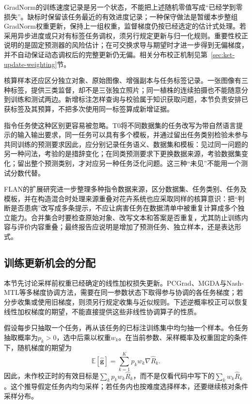 GradNorm的训练速度记录是另一个状态，不能把上述随机零值写成“已经学到零损失”。缺标时保留该任务最近的有效进度记录；一种保守做法是暂缓本步整组GradNorm权重更新，保持上一组权重，监督梯度仍按已经选定的估计式处理。若采用异步进度或只对有标签任务调权，须另行规定更新与归一化规则。重要性校正说明的是固定预测器的风险估计；在可交换求导与期望时才进一步得到无偏梯度，并不自动保证动态调权后的完整更新仍无偏。相关分布校正机制见第~\ref{sec:ket-update-weighting}节。

核算样本还应区分独立对象、原始图像、增强副本与任务标签记录。一张图像有三种标签，提供三类监督，却不是三张独立照片；同一植株的连续拍摄也不能随意分到训练和测试两边。新增标注怎样查询与校验属于知识获取问题，本节负责安排已获标签及其预算，不把多次使用同一标签算成新增证据。

指令任务使这种区别更容易被忽略。T0将不同数据集的任务改写为带自然语言提示的输入输出要求，同一任务可以具有多个模板，并通过留出任务类别检验未参与共同训练的预测要求因此，应分别记录任务语义、数据集和模板：见过同一问题的另一种问法，考验的是措辞变化；在同类预测要求下更换数据来源，考验数据集变化；留出整个预测类别，才对应另一种任务泛化问题。这三种“未见”不能用一个测试分数代替。

FLAN的扩展研究进一步整理多种指令数据来源，区分数据集、任务类别、任务及模板，并在构造混合时处理来源重叠对花卉系统也应采取同样的核算意识：把“判断是否患病”改写成多条提示，不应让病害任务在数据清单中被重复计算成多个独立能力。合并集合时要检查原始对象、改写文本和答案是否重复，尤其防止训练内容与评价内容重叠；最终报告应说明是增加了预测任务、独立样本，还是表达形式。

\subsection{训练更新机会的分配}
\label{sec:ket-sharing-sampling}

本节先讨论采样前权重已经确定的线性加权损失更新。PCGrad、MGDA与Nash-MTL等多梯度协调方法，需要在同一参数状态下取得参与协调的各任务梯度；若分步收集或使用旧梯度，则须另行规定收集与近似规则。下述逆概率校正可以恢复线性加权梯度的期望，不能直接提供这些非线性协调算子的性质。

假设每步只抽取一个任务，再从该任务的已标注训练集中均匀抽一个样本。令任务抽取概率为$p_k>0$，选中后乘以权重$w_k$。在当前参数、采样概率及权重固定的条件下，随机梯度的期望为
\begin{equation}
  \mathbb E[\widehat{\bm g}]
  =\sum_{k=1}^{K}p_kw_k
    \nabla\hat R_k.
  \label{eq:ket-sharing-effective-objective}
\end{equation}
因此，未作校正时的有效目标是$\sum_kp_kw_k\hat R_k$，而不是仅看代码中写下的$\sum_kw_k\hat R_k$。这个推导假定任务内均匀采样；若任务内也按难度选择样本，还要继续核对条件采样分布。

